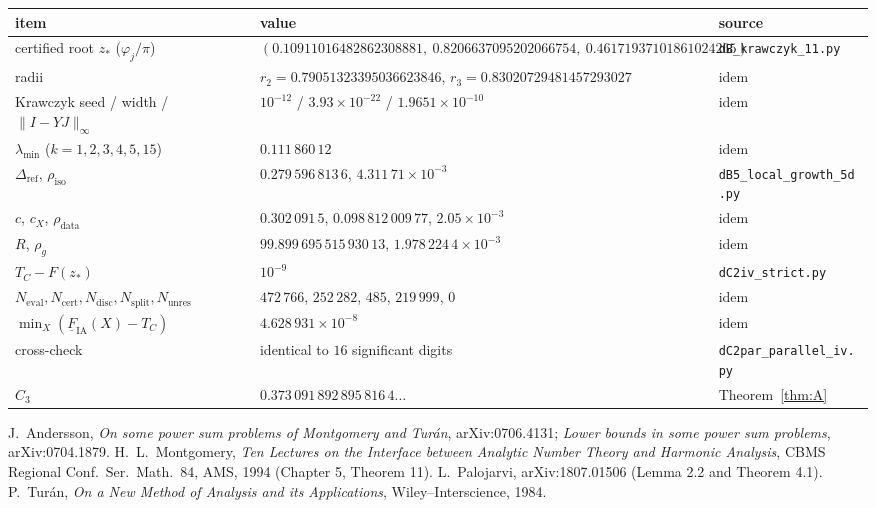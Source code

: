 \documentclass[11pt]{article}
\theoremstyle{remark}
\begin{document}
\begin{center}
\begin{tabular}{lll}
\toprule
item & value & source \\
\midrule
certified root $z_*$ ($\varphi_j/\pi$) & $(0.10911016482862308881,\ 0.8206637095202066754,\ 0.46171937101861024265)$ & \texttt{dB\_krawczyk\_11.py}\\
radii & $r_2=0.79051323395036623846$, $r_3=0.83020729481457293027$ & idem\\
Krawczyk seed / width / $\|I-YJ\|_\infty$ & $10^{-12}$ / $3.93\times10^{-22}$ / $1.9651\times10^{-10}$ & idem\\
$\lambda_{\min}$ ($k=1,2,3,4,5,15$) & $0.111\,860\,12$ & idem\\
$\Delta_{\mathrm{ref}}$, $\rho_{\mathrm{iso}}$ & $0.279\,596\,813\,6$, $4.311\,71\times10^{-3}$ & \texttt{dB5\_local\_growth\_5d.py}\\
$c$, $c_X$, $\rho_{\mathrm{data}}$ & $0.302\,091\,5$, $0.098\,812\,009\,77$, $2.05\times10^{-3}$ & idem\\
$R$, $\rho_g$ & $99.899\,695\,515\,930\,13$, $1.978\,224\,4\times10^{-3}$ & idem\\
$T_C-F(z_*)$ & $10^{-9}$ & \texttt{dC2iv\_strict.py}\\
$N_{\mathrm{eval}},N_{\mathrm{cert}},N_{\mathrm{disc}},N_{\mathrm{split}},N_{\mathrm{unres}}$ & $472\,766$, $252\,282$, $485$, $219\,999$, $0$ & idem\\
$\min_X(\underline F_{\mathrm{IA}}(X)-T_C)$ & $4.628\,931\times10^{-8}$ & idem\\
cross-check & identical to $16$ significant digits & \texttt{dC2par\_parallel\_iv.py}\\
$C_3$ & $0.373\,091\,892\,895\,816\,4\ldots$ & Theorem~\ref{thm:A}\\
\bottomrule
\end{tabular}
\end{center}

\begin{thebibliography}{9}
 J.~Andersson, \emph{On some power sum problems of Montgomery and Tur\'an},
arXiv:0706.4131; \emph{Lower bounds in some power sum problems}, arXiv:0704.1879.
 H.~L.~Montgomery, \emph{Ten Lectures on the Interface between Analytic Number Theory
and Harmonic Analysis}, CBMS Regional Conf.\ Ser.\ Math.\ 84, AMS, 1994 (Chapter 5, Theorem 11).
 L.~Palojarvi, arXiv:1807.01506 (Lemma 2.2 and Theorem 4.1).
 P.~Tur\'an, \emph{On a New Method of Analysis and its Applications},
Wiley--Interscience, 1984.
\end{thebibliography}
\end{document}
